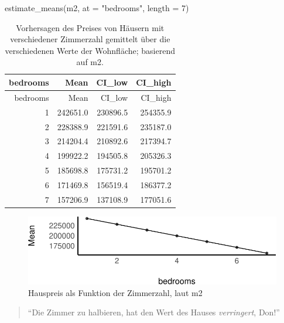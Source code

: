 \documentclass[
  a4paper,
  DIV=11]{scrreprt}
\newenvironment{Shaded}{\begin{snugshade}}{\end{snugshade}}
\newcommand{\AttributeTok}[1]{\textcolor[rgb]{0.40,0.45,0.13}{#1}}
\newcommand{\DecValTok}[1]{\textcolor[rgb]{0.68,0.00,0.00}{#1}}
\newcommand{\FunctionTok}[1]{\textcolor[rgb]{0.28,0.35,0.67}{#1}}
\newcommand{\NormalTok}[1]{\textcolor[rgb]{0.00,0.23,0.31}{#1}}
\newcommand{\StringTok}[1]{\textcolor[rgb]{0.13,0.47,0.30}{#1}}
\theoremstyle{definition}
\theoremstyle{remark}
\begin{document}
\begin{Shaded}
\begin{Highlighting}[]
\FunctionTok{estimate\_means}\NormalTok{(m2, }\AttributeTok{at =} \StringTok{"bedrooms"}\NormalTok{, }\AttributeTok{length =} \DecValTok{7}\NormalTok{)}
\end{Highlighting}
\end{Shaded}

\hypertarget{tbl-m2-estimate-pred2}{}
\begin{longtable}[]{@{}rrrr@{}}
\caption{\label{tbl-m2-estimate-pred2}Vorhersagen des Preises von
Häusern mit verschiedener Zimmerzahl gemittelt über die verschiedenen
Werte der Wohnfläche; basierend auf m2.}\tabularnewline
\toprule()
bedrooms & Mean & CI\_low & CI\_high \\
\midrule()
\endfirsthead
\toprule()
bedrooms & Mean & CI\_low & CI\_high \\
\midrule()
\endhead
1 & 242651.0 & 230896.5 & 254355.9 \\
2 & 228388.9 & 221591.6 & 235187.0 \\
3 & 214204.4 & 210892.6 & 217394.7 \\
4 & 199922.2 & 194505.8 & 205326.3 \\
5 & 185698.8 & 175731.2 & 195701.2 \\
6 & 171469.8 & 156519.4 & 186377.2 \\
7 & 157206.9 & 137108.9 & 177051.6 \\
\bottomrule()
\end{longtable}

\begin{figure}

{\centering \includegraphics{./kausal_files/figure-pdf/fig-m2-preds-1.pdf}

}

\caption{\label{fig-m2-preds}Hauspreis als Funktion der Zimmerzahl, laut
m2}

\end{figure}

\begin{quote}
``Die Zimmer zu halbieren, hat den Wert des Hauses \emph{verringert},
Don!''
\end{quote}
\end{document}
